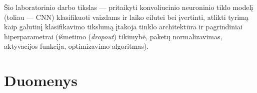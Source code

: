 \documentclass[]{VUMIFTemplateClass}
\begin{document}

\onehalfspacing



\singlespacing

\tableofcontents
\onehalfspacing






Šio laboratorinio darbo tikslas --- pritaikyti konvoliucinio neuroninio tiklo modelį (toliau --- CNN) klasifikuoti vaizdams ir laiko eilutei bei įvertinti, atlikti tyrimą kaip galutinį klasifikavimo tikslumą įtakoja tinklo architektūra ir pagrindiniai hiperparametrai (išmetimo (\textit{dropout}) tikimybė, paketų normalizavimas, aktyvacijos funkcija, optimizavimo algoritmas).


\section{Duomenys}\label{sec:duomenys}
\end{document}
